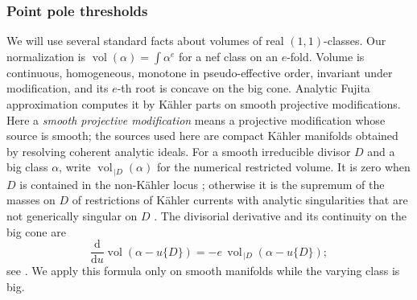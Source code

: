 \subsubsection{Point pole thresholds}

We will use several standard facts about volumes of real \((1,1)\)-classes.
Our normalization is \(\operatorname{vol}(\alpha)=\int\alpha^e\) for a nef class on an
\(e\)-fold.  Volume is continuous, homogeneous, monotone in
pseudo-effective order, invariant under modification, and its \(e\)-th
root is concave on the big cone.  Analytic Fujita approximation computes
it by Kähler parts on smooth projective modifications.  Here a
\emph{smooth projective modification} means a projective modification
whose source is smooth; the sources used here are compact Kähler
manifolds obtained by resolving coherent analytic ideals.  For a smooth
irreducible divisor \(D\) and a big class \(\alpha\), write
\(\operatorname{vol}_{\,|D}(\alpha)\) for the numerical restricted volume.
It is zero when \(D\) is contained in the non-Kähler locus
\cite[Theorem~1.1]{Vu2023}; otherwise it is
the supremum of the masses on \(D\) of restrictions of Kähler currents
with analytic singularities that are not generically singular on \(D\)
\cite[Lemma~2.7]{CollinsTosatti2018}.  The divisorial derivative and its
continuity on the big cone are
\begin{equation}\label{zero:volume-derivative}
 \frac{\mathrm{d}}{\mathrm{d} u}\operatorname{vol}(\alpha-u\{D\})
   =-e\,\operatorname{vol}_{\,|D}(\alpha-u\{D\});
\end{equation}
see \cite[Theorem~1.1]{Vu2023}.  We apply this formula only on smooth
manifolds while the varying class is big.

